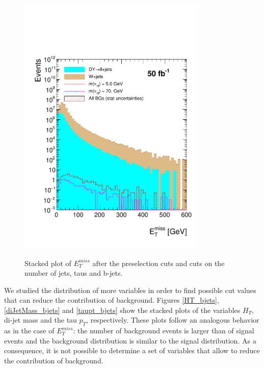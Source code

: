  \begin{figure}[h] 
 \centering
 \caption{Stacked plot of $E_T^{miss}$ after the preselection cuts and cuts on the number of jets, taus and b-jets.}
 \includegraphics[width=0.8\textwidth]{./Capitulos/Analysis/AfterBJets/MET_MET_20} 
 \label{MET_bjets}
 \end{figure}
 
We studied the distribution of more variables in order to find possible cut values that can reduce the contribution of background. Figures \ref{HT_bjets}, \ref{diJetMass_bjets} and \ref{taupt_bjets} show the stacked plots of the variables $H_T$, di-jet mass and the tau $p_T$, respectively. These plots follow an analogous behavior as in the case of $E_T^{miss}$: the number of background events is larger than of signal events and the background distribution is similar to the signal distribution. As a consequence, it is not possible to determine a set of variables that allow to reduce the contribution of background.
 

